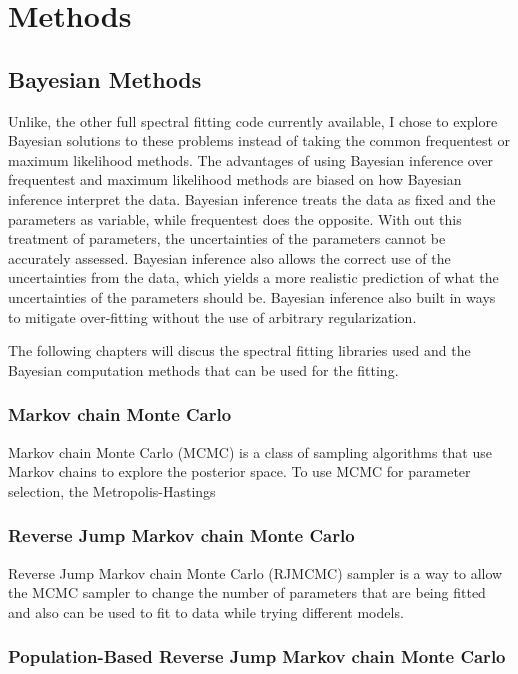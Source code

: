 \documentclass[12pt,oneside,a4paper]{book}
\begin{document}
\chapter{Methods}
\section{Bayesian Methods}
Unlike, the other full spectral fitting code currently available, I chose to explore Bayesian solutions to these problems instead of taking the common frequentest or maximum likelihood methods. The advantages of using Bayesian inference over frequentest and maximum likelihood methods are biased on how Bayesian inference interpret the data. Bayesian inference treats the data as fixed and the parameters as variable, while frequentest does the opposite. With out this treatment of parameters, the uncertainties of the parameters cannot be accurately assessed. Bayesian inference also allows the correct use of the uncertainties from the data, which yields a more realistic prediction of what the uncertainties of the parameters should be. Bayesian inference also built in ways to mitigate over-fitting without the use of arbitrary regularization.

The following chapters will discus the spectral fitting libraries used and the Bayesian computation methods that can be used for the fitting.


\subsection{Markov chain Monte Carlo}
Markov chain Monte Carlo (MCMC) is a class of sampling algorithms that use Markov chains to explore the posterior space. To use MCMC for parameter selection, the Metropolis-Hastings

\subsection{Reverse Jump Markov chain Monte Carlo}

Reverse Jump Markov chain Monte Carlo (RJMCMC) sampler is a way to allow the 
MCMC sampler to change the number of parameters that are being fitted and also 
can be used to fit to data while trying different models.

\subsection{Population-Based Reverse Jump Markov chain Monte Carlo}
\end{document}
